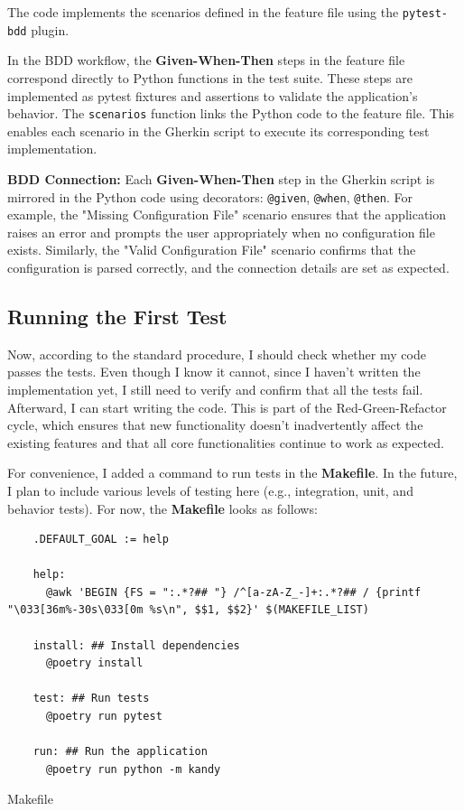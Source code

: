 \documentclass[10pt , a4paper]{report}
\newenvironment{code}{\captionsetup{type=listing}}{}
\begin{document}
The code implements the scenarios defined in the feature file using the \texttt{pytest-bdd} plugin. 

In the BDD workflow, the \textbf{Given-When-Then} steps in the feature file correspond directly to Python functions in the test suite. These steps are implemented as pytest fixtures and assertions to validate the application's behavior.
The \texttt{scenarios} function links the Python code to the feature file. This enables each scenario in the Gherkin script to execute its corresponding test implementation.

\textbf{BDD Connection:}
Each \textbf{Given-When-Then} step in the Gherkin script is mirrored in the Python code using decorators: \texttt{@given}, \texttt{@when}, \texttt{@then}. For example, the "Missing Configuration File" scenario ensures that the application raises an error and prompts the user appropriately when no configuration file exists. Similarly, the "Valid Configuration File" scenario confirms that the configuration is parsed correctly, and the connection details are set as expected.

\subsection{Running the First Test}

Now, according to the standard procedure, I should check whether my code passes the tests. Even though I know it cannot, since I haven't written the implementation yet, I still need to verify and confirm that all the tests fail. Afterward, I can start writing the code. This is part of the Red-Green-Refactor cycle, which ensures that new functionality doesn't inadvertently affect the existing features and that all core functionalities continue to work as expected.

\newpage
For convenience, I added a command to run tests in the \textbf{Makefile}. In the future, I plan to include various levels of testing here (e.g., integration, unit, and behavior tests). For now, the \textbf{Makefile} looks as follows:

\begin{code}
  \begin{verbatim}
    .DEFAULT_GOAL := help

    help:
      @awk 'BEGIN {FS = ":.*?## "} /^[a-zA-Z_-]+:.*?## / {printf "\033[36m%-30s\033[0m %s\n", $$1, $$2}' $(MAKEFILE_LIST)

    install: ## Install dependencies
      @poetry install

    test: ## Run tests
      @poetry run pytest

    run: ## Run the application
      @poetry run python -m kandy
  \end{verbatim}
  \caption{Makefile}
\end{code}
\end{document}

